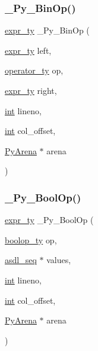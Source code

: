 \mbox{\label{_python-ast_8h_ab7097e515f5a83d39487d5a585463dac}} 
\subsubsection{\texorpdfstring{\_Py\_BinOp()}{\_Py\_BinOp()}}
{\footnotesize\ttfamily \mbox{\hyperlink{_python-ast_8h_a56d3705e020a071405094a220c4592bd}{expr\+\_\+ty}} \+\_\+\+Py\+\_\+\+Bin\+Op (\begin{DoxyParamCaption}\item[{\mbox{\hyperlink{_python-ast_8h_a56d3705e020a071405094a220c4592bd}{expr\+\_\+ty}}}]{left,  }\item[{\mbox{\hyperlink{_python-ast_8h_a64ffe6085a53816a513038b9f1a04a9d}{operator\+\_\+ty}}}]{op,  }\item[{\mbox{\hyperlink{_python-ast_8h_a56d3705e020a071405094a220c4592bd}{expr\+\_\+ty}}}]{right,  }\item[{\mbox{\hyperlink{warnings_8h_a74f207b5aa4ba51c3a2ad59b219a423b}{int}}}]{lineno,  }\item[{\mbox{\hyperlink{warnings_8h_a74f207b5aa4ba51c3a2ad59b219a423b}{int}}}]{col\+\_\+offset,  }\item[{\mbox{\hyperlink{pyarena_8h_a9edeb357fbb27333471022a0975adb7a}{Py\+Arena}} $\ast$}]{arena }\end{DoxyParamCaption})}

\mbox{\label{_python-ast_8h_a8441169f71a59d05748d4652ad0f691f}} 
\subsubsection{\texorpdfstring{\_Py\_BoolOp()}{\_Py\_BoolOp()}}
{\footnotesize\ttfamily \mbox{\hyperlink{_python-ast_8h_a56d3705e020a071405094a220c4592bd}{expr\+\_\+ty}} \+\_\+\+Py\+\_\+\+Bool\+Op (\begin{DoxyParamCaption}\item[{\mbox{\hyperlink{_python-ast_8h_ab7ba8d66d81017932471af1f2609a830}{boolop\+\_\+ty}}}]{op,  }\item[{\mbox{\hyperlink{structasdl__seq}{asdl\+\_\+seq}} $\ast$}]{values,  }\item[{\mbox{\hyperlink{warnings_8h_a74f207b5aa4ba51c3a2ad59b219a423b}{int}}}]{lineno,  }\item[{\mbox{\hyperlink{warnings_8h_a74f207b5aa4ba51c3a2ad59b219a423b}{int}}}]{col\+\_\+offset,  }\item[{\mbox{\hyperlink{pyarena_8h_a9edeb357fbb27333471022a0975adb7a}{Py\+Arena}} $\ast$}]{arena }\end{DoxyParamCaption})}

